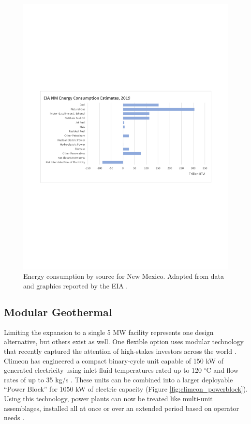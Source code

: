 \begin{figure}[!htp]
\centering
\includegraphics[width=\textwidth]{templates/images/Figure-EIA_NM_Energy_Consumption.pdf}
\caption[New Mexico energy consumption]{Energy consumption by source for New Mexico. Adapted from data and graphics reported by the EIA \protect\citep{eia_new_2021}.}
\label{fig:nm_energy_consumption}
\end{figure}

\subsection{Modular Geothermal}\label{ch4:modular_geothermal}

Limiting the expansion to a single 5 MW facility represents one design alternative, but others exist as well. One flexible option uses modular technology that recently captured the attention of high-stakes investors across the world \citep{shieber_bill_2019}. Climeon has engineered a compact binary-cycle unit capable of 150 kW of generated electricity using inlet fluid temperatures rated up to 120 $^\circ$C and flow rates of up to 35 kg/s \citep{climeon_climeon_2021-1}. These units can be combined into a larger deployable ``Power Block'' for 1050 kW of electric capacity \citep{winther_power_2018} (Figure \ref{fig:climeon_powerblock}). Using this technology, power plants can now be treated like multi-unit assemblages, installed all at once or over an extended period based on operator needs \citep{climeon_why_2018}.

